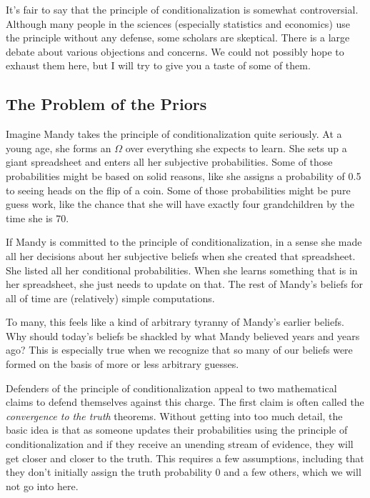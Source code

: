 It's fair to say that the principle of conditionalization is somewhat controversial.  Although many people in the sciences (especially statistics and economics) use the principle without any defense, some scholars are skeptical. There is a large debate about various objections and concerns. We could not possibly hope to exhaust them here, but I will try to give you a taste of some of them.

\subsection{The Problem of the Priors}

Imagine Mandy takes the principle of conditionalization quite seriously. At a young age, she forms an $\Omega$ over everything she expects to learn.  She sets up a giant spreadsheet and enters all her subjective probabilities.  Some of those probabilities might be based on solid reasons, like she assigns a probability of 0.5 to seeing heads on the flip of a coin.  Some of those probabilities might be pure guess work, like the chance that she will have exactly four grandchildren by the time she is 70. 

If Mandy is committed to the principle of conditionalization, in a sense she made all her decisions about her subjective beliefs when she created that spreadsheet. She listed all her conditional probabilities.  When she learns something that is in her spreadsheet, she just needs to update on that.  The rest of Mandy's beliefs for all of time are (relatively) simple computations.

To many, this feels like a kind of arbitrary tyranny of Mandy's earlier beliefs. Why should today's beliefs be shackled by what Mandy believed years and years ago?  This is especially true when we recognize that so many of our beliefs were formed on the basis of more or less arbitrary guesses.

Defenders of the principle of conditionalization appeal to two mathematical claims to defend themselves against this charge. The first claim is often called the {\it convergence to the truth} theorems.  Without getting into too much detail, the basic idea is that as someone updates their probabilities using the principle of conditionalization and if they receive an unending stream of evidence, they will get closer and closer to the truth.  This requires a few assumptions, including that they don't initially assign the truth probability $0$ and a few others, which we will not go into here.


